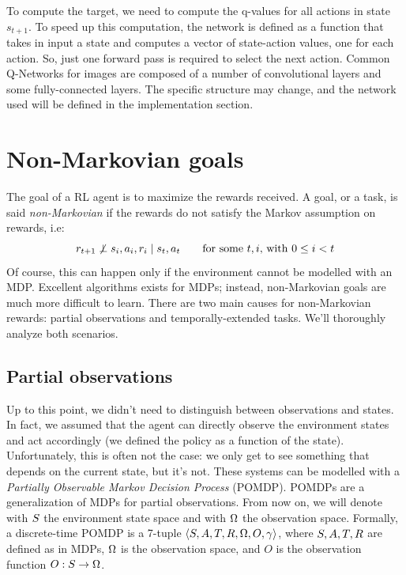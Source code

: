 To compute the target, we need to compute the q-values for all actions in
state $s_{t+1}$. To speed up this computation, the network is defined as a
function that takes in input a state and computes a vector of state-action
values, one for each action. So, just one forward pass is required to select
the next action. Common Q-Networks for images are composed of a number of
convolutional layers and some fully-connected layers. The specific structure
may change, and the network used will be defined in the implementation section.


\section{Non-Markovian goals}

\label{sec:non-markov}

The goal of a RL agent is to maximize the rewards received.  A goal, or a
task, is said \emph{non-Markovian} if the rewards do not satisfy the Markov
assumption on rewards, i.e:
\begin{equation}
	r_{t+1} \not\perp s_i, a_i, r_i \mid s_t, a_t
	\qquad \text{for some $t, i$, with $0 \le i < t$}
	\label{eq:markov-rewards}
\end{equation}
Of course, this can happen only if the environment cannot be modelled with an
MDP. Excellent algorithms exists for MDPs; instead, non-Markovian goals are
much more difficult to learn.  There are two main causes for non-Markovian
rewards: partial observations and temporally-extended tasks. We'll thoroughly
analyze both scenarios.


\subsection{Partial observations}

\label{sec:partial-obs}

Up to this point, we didn't need to distinguish between observations and
states. In fact, we assumed that the agent can directly observe the
environment states and act accordingly (we defined the policy as a function of
the state). Unfortunately, this is often not the case: we only get to see
something that depends on the current state, but it's not. These systems can
be modelled with a \emph{Partially Observable Markov Decision Process}
(POMDP).
POMDPs are a generalization of MDPs for partial observations. From now on, we
will denote with $S$ the environment state space and with $\Omega$ the
observation space. Formally, a discrete-time POMDP is a 7-tuple ${\langle
S, A, T, R, \Omega, O, \gamma \rangle}$, where $S, A, T, R$ are
defined as in MDPs, $\Omega$ is the observation space, and $O$ is the
observation function ${O: S \to \Omega}$.

